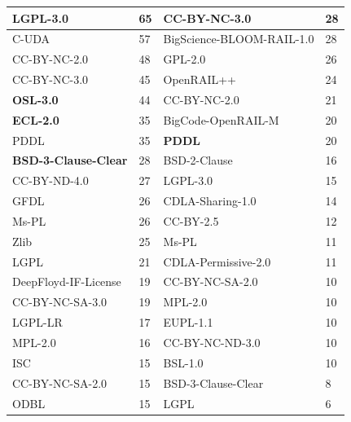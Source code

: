 \begin{table}[]
\begin{tabular}{|ll||ll|}
    \multicolumn{1}{|l|}{\textbf{LGPL-3.0}} & 65 & \multicolumn{1}{l|}{CC-BY-NC-3.0} & 28 \\ \hline
    \multicolumn{1}{|l|}{C-UDA} & 57 & \multicolumn{1}{l|}{BigScience-BLOOM-RAIL-1.0} & 28 \\ \hline
    \multicolumn{1}{|l|}{CC-BY-NC-2.0} & 48 & \multicolumn{1}{l|}{GPL-2.0} & 26 \\ \hline
    \multicolumn{1}{|l|}{CC-BY-NC-3.0} & 45 & \multicolumn{1}{l|}{OpenRAIL++} & 24 \\ \hline
    \multicolumn{1}{|l|}{\textbf{OSL-3.0}} & 44 & \multicolumn{1}{l|}{CC-BY-NC-2.0} & 21 \\ \hline
    \multicolumn{1}{|l|}{\textbf{ECL-2.0}} & 35 & \multicolumn{1}{l|}{BigCode-OpenRAIL-M} & 20 \\ \hline
    \multicolumn{1}{|l|}{PDDL} & 35 & \multicolumn{1}{l|}{\textbf{PDDL}} & 20 \\ \hline
    \multicolumn{1}{|l|}{\textbf{BSD-3-Clause-Clear}} & 28 & \multicolumn{1}{l|}{BSD-2-Clause} & 16 \\ \hline
    \multicolumn{1}{|l|}{CC-BY-ND-4.0} & 27 & \multicolumn{1}{l|}{LGPL-3.0} & 15 \\ \hline
    \multicolumn{1}{|l|}{GFDL} & 26 & \multicolumn{1}{l|}{CDLA-Sharing-1.0} & 14 \\ \hline
    \multicolumn{1}{|l|}{Ms-PL} & 26 & \multicolumn{1}{l|}{CC-BY-2.5} & 12 \\ \hline
    \multicolumn{1}{|l|}{Zlib} & 25 & \multicolumn{1}{l|}{Ms-PL} & 11 \\ \hline
    \multicolumn{1}{|l|}{LGPL} & 21 & \multicolumn{1}{l|}{CDLA-Permissive-2.0} & 11 \\ \hline
    \multicolumn{1}{|l|}{DeepFloyd-IF-License} & 19 & \multicolumn{1}{l|}{CC-BY-NC-SA-2.0} & 10 \\ \hline
    \multicolumn{1}{|l|}{CC-BY-NC-SA-3.0} & 19 & \multicolumn{1}{l|}{MPL-2.0} & 10 \\ \hline
    \multicolumn{1}{|l|}{LGPL-LR} & 17 & \multicolumn{1}{l|}{EUPL-1.1} & 10 \\ \hline
    \multicolumn{1}{|l|}{MPL-2.0} & 16 & \multicolumn{1}{l|}{CC-BY-NC-ND-3.0} & 10 \\ \hline
    \multicolumn{1}{|l|}{ISC} & 15 & \multicolumn{1}{l|}{BSL-1.0} & 10 \\ \hline
    \multicolumn{1}{|l|}{CC-BY-NC-SA-2.0} & 15 & \multicolumn{1}{l|}{BSD-3-Clause-Clear} & 8 \\ \hline
    \multicolumn{1}{|l|}{ODBL} & 15 & \multicolumn{1}{l|}{LGPL} & 6 \\ \hline

\end{tabular}
\end{table}
